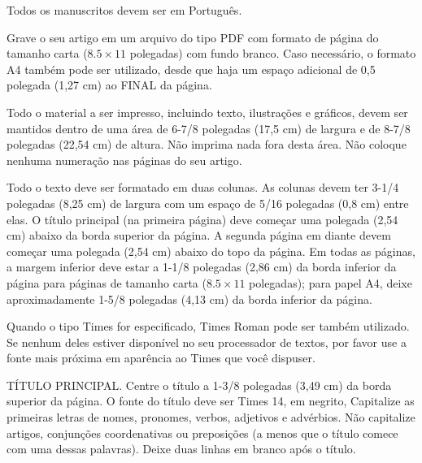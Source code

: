 \documentclass[10pt,twocolumn]{article}
\begin{document}

Todos os manuscritos devem ser em Português. 


Grave o seu artigo em um arquivo do tipo PDF com formato 
de página do tamanho carta ($8.5 \times 11$ polegadas)
com fundo branco. Caso necessário, o formato A4 também 
pode ser utilizado, desde que haja um espaço adicional de 0,5 
polegada (1,27 cm) ao FINAL da página. 


Todo o material a ser impresso, incluindo texto, ilustrações e gráficos, 
devem ser mantidos dentro de uma área de 6-7/8 polegadas (17,5 cm) de
largura e de  8-7/8 polegadas (22,54 cm) de altura. Não imprima nada fora 
desta área. Não coloque nenhuma numeração nas páginas do seu artigo. 


Todo o texto deve ser formatado em duas colunas. As colunas devem ter 3-1/4 polegadas 
(8,25 cm) de largura com um espaço de 5/16 polegadas (0,8 cm) entre elas.
O título principal (na primeira página) deve começar uma polegada (2,54 cm) 
abaixo da borda superior da página. A segunda página em diante devem começar
uma polegada (2,54 cm) abaixo do topo da página. Em todas as páginas, a margem
inferior deve estar a 1-1/8 polegadas (2,86 cm) da borda inferior da página 
para páginas de tamanho carta ($8.5 \times 11$ polegadas); para papel A4, 
deixe aproximadamente 1-5/8 polegadas (4,13 cm) da borda inferior da página. 


Quando o tipo Times for especificado, Times Roman pode ser também utilizado. 
Se nenhum deles estiver disponível no seu processador de textos, por favor
use a fonte mais próxima em aparência ao Times que você dispuser. 

TÍTULO PRINCIPAL. Centre o título a 1-3/8 polegadas (3,49 cm) da borda 
superior da página.  O fonte do título deve ser Times 14, em negrito, 
Capitalize as primeiras letras de nomes, pronomes, verbos, adjetivos 
e advérbios. Não capitalize artigos, conjunções coordenativas ou preposições
(a menos que o título comece com uma dessas palavras).
Deixe duas linhas em branco após o título. 
\end{document}
